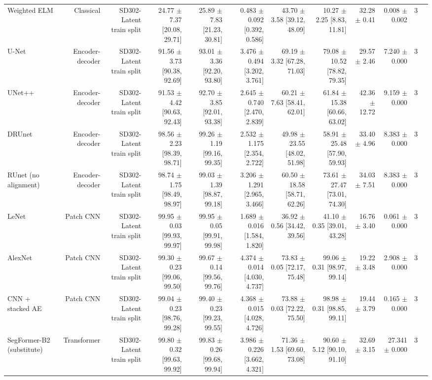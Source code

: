 \begin{table}[t]
\begin{tabular}{lrrrrrrrrrrr}
Weighted ELM & Classical & SD302-Latent train split & 24.77 $\pm$ 7.37 [20.08, 29.71] & 25.89 $\pm$ 7.83 [21.23, 30.81] & 0.483 $\pm$ 0.092 [0.392, 0.586] & 43.70 $\pm$ 3.58 [39.12, 48.09] & 10.27 $\pm$ 2.25 [8.83, 11.81] & 32.28 $\pm$ 0.41 & 0.008 $\pm$ 0.002 & 3 &  \\
U-Net & Encoder-decoder & SD302-Latent train split & 91.56 $\pm$ 3.73 [90.38, 92.69] & 93.01 $\pm$ 3.36 [92.20, 93.80] & 3.476 $\pm$ 0.494 [3.202, 3.761] & 69.19 $\pm$ 3.32 [67.28, 71.03] & 79.08 $\pm$ 10.52 [78.82, 79.35] & 29.57 $\pm$ 2.46 & 7.240 $\pm$ 0.000 & 3 &  \\
UNet++ & Encoder-decoder & SD302-Latent train split & 91.53 $\pm$ 4.42 [90.63, 92.43] & 92.70 $\pm$ 3.85 [92.01, 93.38] & 2.645 $\pm$ 0.740 [2.470, 2.839] & 60.21 $\pm$ 7.63 [58.41, 62.01] & 61.84 $\pm$ 15.38 [60.66, 63.02] & 42.36 $\pm$ 12.72 & 9.159 $\pm$ 0.000 & 3 &  \\
DRUnet & Encoder-decoder & SD302-Latent train split & 98.56 $\pm$ 2.23 [98.39, 98.71] & 99.26 $\pm$ 1.19 [99.16, 99.35] & 2.532 $\pm$ 1.175 [2.354, 2.722] & 49.98 $\pm$ 23.55 [48.02, 51.98] & 58.91 $\pm$ 25.48 [57.90, 59.93] & 33.40 $\pm$ 4.96 & 8.383 $\pm$ 0.000 & 3 &  \\
RUnet (no alignment) & Encoder-decoder & SD302-Latent train split & 98.74 $\pm$ 1.75 [98.49, 98.97] & 99.03 $\pm$ 1.39 [98.87, 99.18] & 3.206 $\pm$ 1.291 [2.965, 3.466] & 60.50 $\pm$ 18.58 [58.71, 62.26] & 73.61 $\pm$ 27.47 [73.01, 74.30] & 34.03 $\pm$ 7.51 & 8.383 $\pm$ 0.000 & 3 &  \\
LeNet & Patch CNN & SD302-Latent train split & 99.95 $\pm$ 0.03 [99.93, 99.97] & 99.95 $\pm$ 0.05 [99.91, 99.98] & 1.689 $\pm$ 0.016 [1.584, 1.820] & 36.92 $\pm$ 0.56 [34.42, 39.56] & 41.10 $\pm$ 0.35 [39.01, 43.28] & 16.76 $\pm$ 3.40 & 0.061 $\pm$ 0.000 & 3 &  \\
AlexNet & Patch CNN & SD302-Latent train split & 99.30 $\pm$ 0.23 [99.06, 99.50] & 99.67 $\pm$ 0.14 [99.56, 99.76] & 4.374 $\pm$ 0.014 [4.030, 4.737] & 73.83 $\pm$ 0.05 [72.17, 75.48] & 99.06 $\pm$ 0.31 [98.97, 99.14] & 19.22 $\pm$ 3.48 & 2.908 $\pm$ 0.000 & 3 &  \\
CNN + stacked AE & Patch CNN & SD302-Latent train split & 99.04 $\pm$ 0.23 [98.76, 99.28] & 99.40 $\pm$ 0.23 [99.23, 99.55] & 4.368 $\pm$ 0.015 [4.028, 4.726] & 73.88 $\pm$ 0.03 [72.22, 75.50] & 98.98 $\pm$ 0.31 [98.85, 99.11] & 19.44 $\pm$ 3.79 & 0.165 $\pm$ 0.000 & 3 &  \\
SegFormer-B2 (substitute) & Transformer & SD302-Latent train split & 99.80 $\pm$ 0.32 [99.63, 99.92] & 99.83 $\pm$ 0.26 [99.68, 99.94] & 3.986 $\pm$ 0.226 [3.662, 4.321] & 71.36 $\pm$ 1.53 [69.60, 73.08] & 90.60 $\pm$ 5.12 [90.10, 91.10] & 32.69 $\pm$ 3.15 & 27.341 $\pm$ 0.000 & 3 &  \\

\end{tabular}
\end{table}

